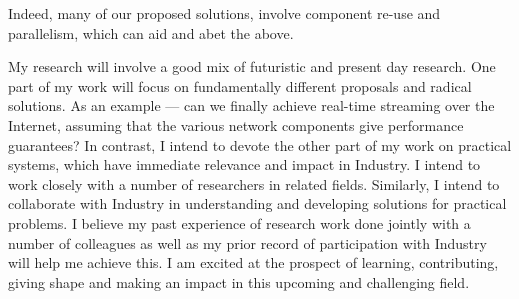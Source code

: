 \documentclass[a4paper, 10pt]{article}
\begin{document}
\begin{small}
Indeed, many of our proposed solutions, involve component re-use and 
parallelism, which can aid and abet the above.

 My research will involve a good mix of futuristic and present 
day research. 
One part of my work will focus on fundamentally different proposals and
radical solutions. As an example
--- can we finally achieve real-time streaming over the Internet,
assuming that the various network components give performance guarantees?
In contrast, I intend to devote the other part of my work 
on practical systems, which have immediate relevance and impact in Industry.
I intend to work closely with a number of
researchers in related fields. Similarly, I intend to
collaborate with Industry in understanding and developing solutions
for practical problems. I believe my past experience of research
work done jointly with a number of colleagues as well as my prior record
of participation with Industry will help me achieve this. 
I am excited at the
prospect of learning, contributing, giving shape and making an
impact in this upcoming and challenging field.  





\vspace{0.5cm}

\end{small}
\end{document}
